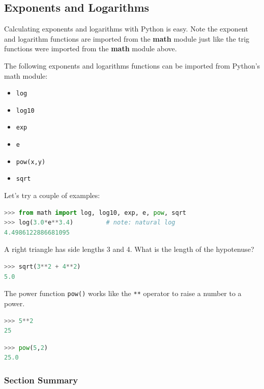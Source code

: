 \documentclass{book}
\providecommand{\tightlist}{%
      \setlength{\itemsep}{0pt}\setlength{\parskip}{0pt}}
\begin{document}
    
        \subsection{Exponents and Logarithms}\label{exponents-and-logarithms}

Calculating exponents and logarithms with Python is easy. Note the
exponent and logarithm functions are imported from the \textbf{math}
module just like the trig functions were imported from the \textbf{math}
module above.

The following exponents and logarithms functions can be imported from
Python's math module:

\begin{itemize}
\tightlist
\item
  \lstinline!log!
\item
  \lstinline!log10!
\item
  \lstinline!exp!
\item
  \lstinline!e!
\item
  \lstinline!pow(x,y)!
\item
  \lstinline!sqrt!
\end{itemize}

Let's try a couple of examples:

\begin{lstlisting}[language=Python]
>>> from math import log, log10, exp, e, pow, sqrt
>>> log(3.0*e**3.4)         # note: natural log
4.4986122886681095
\end{lstlisting}

A right triangle has side lengths 3 and 4. What is the length of the
hypotenuse?

\begin{lstlisting}[language=Python]
>>> sqrt(3**2 + 4**2)
5.0 
\end{lstlisting}

The power function \lstinline!pow()! works like the \lstinline!**!
operator to raise a number to a power.

\begin{lstlisting}[language=Python]
>>> 5**2
25
\end{lstlisting}

\begin{lstlisting}[language=Python]
>>> pow(5,2)
25.0
\end{lstlisting}

\subsubsection{Section Summary}\label{section-summary}
\end{document}
